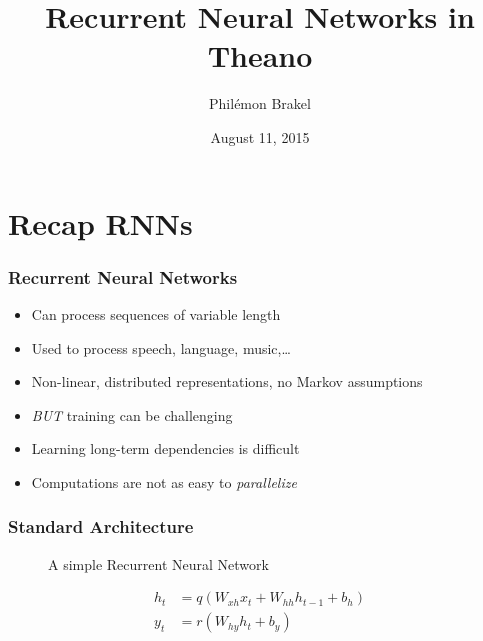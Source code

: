 \documentclass[utf8x,hyperref={pdfpagelabels=false}]{beamer}
\title{Recurrent Neural Networks in Theano}
\author{%
Phil\'{e}mon Brakel
}
\date{August 11, 2015}
\begin{document}
\begin{frame}[plain]
 \titlepage
\end{frame}

\setcounter{page}{1}

\section{Recap RNNs}

\begin{frame}
    \frametitle{Recurrent Neural Networks}
    \begin{itemize}
        \item Can process sequences of variable length
        \item Used to process speech, language, music,\dots
        \item Non-linear, distributed representations, no Markov assumptions
        \item \emph{BUT} training can be challenging
        \item Learning long-term dependencies is difficult
        \item Computations are not as easy to \emph{parallelize}
    \end{itemize}
\end{frame}

\begin{frame}
    \frametitle{Standard Architecture}
\begin{figure}[t]
\centering
{}
\caption{A simple Recurrent Neural Network}
\label{fig:birnn}
\end{figure}
\end{frame}
\begin{frame}
    \begin{align*}
        h_t &= q(W_{xh}x_t + W_{hh}h_{t-1} + b_h)\\
        y_t &= r(W_{hy}h_{t} + b_y)
    \end{align*}
\end{frame}
\end{document}
